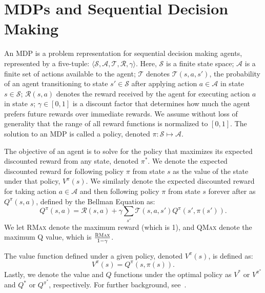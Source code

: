 \section{\acp{MDP} and Sequential Decision Making}



An \ac{MDP} is a problem representation for sequential decision making agents, represented by a five-tuple: $\langle \mathcal{S}, \mathcal{A}, \mathcal{T}, \mathcal{R}, \gamma \rangle$. Here, $\mathcal{S}$ is a finite state space; $\mathcal{A}$ is a finite set of actions available to the agent; $\mathcal{T}$ denotes $\mathcal{T}(s,a, s')$, the probability of an agent transitioning to state $s' \in \mathcal{S}$ after applying action $a \in \mathcal{A}$ in state $s \in \mathcal{S}$; $\mathcal{R}(s,a)$ denotes the reward received by the agent for executing action $a$ in state $s$; $\gamma \in [0, 1]$ is a discount factor that determines how much the agent prefers future rewards over immediate rewards. We assume without loss of generality that the range of all reward functions is normalized to $[0,1]$. The solution to an \ac{MDP} is called a policy, denoted $\pi: \mathcal{S} \mapsto \mathcal{A}$.

The objective of an agent is to solve for the policy that maximizes its expected discounted reward from any state, denoted $\pi^*$. We denote the expected discounted reward for following policy $\pi$ from state $s$ as the value of the state under that policy, $V^\pi(s)$. We similarly denote the expected discounted reward for taking action $a \in \mathcal{A}$ and then following policy $\pi$ from state $s$ forever after as $Q^\pi(s,a)$, defined by the Bellman Equation as:
\begin{equation}
Q^\pi(s,a) = \mathcal{R}(s,a) + \gamma \sum_{s'} \mathcal{T}(s,a,s') Q^\pi(s',\pi(s')).
\end{equation}
We let \textsc{RMax} denote the maximum reward (which is 1), and \textsc{QMax} denote the maximum Q value, which is $\frac{\textsc{RMax}}{1-\gamma}$.

The value function defined under a given policy, denoted $V^\pi(s)$, is defined as:
\begin{equation}
V^\pi(s) = Q^\pi(s,\pi(s)).
\end{equation}
Lastly, we denote the value and $Q$ functions under the optimal policy as $V^*$ or $V^{\pi^*}$ and $Q^*$ or $Q^{\pi^*}$, respectively. For further background, see~\citet{kaelbling1996reinforcement}.
